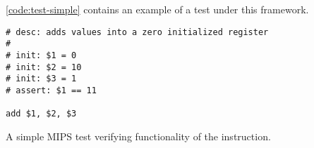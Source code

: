 \autoref{code:test-simple} contains an example of a test under this framework.

\begin{lstfloat}[H]
    \begin{lstlisting}
# desc: adds values into a zero initialized register
#
# init: $1 = 0
# init: $2 = 10
# init: $3 = 1
# assert: $1 == 11

add $1, $2, $3
    \end{lstlisting}
    \caption{A simple MIPS test verifying functionality of the  instruction.}
    \label{code:test-simple}
\end{lstfloat}